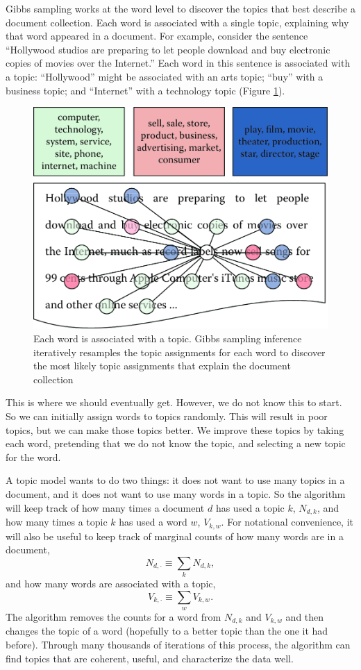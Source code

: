 \documentclass[]{krantz}
\begin{document}
Gibbs sampling works at the word level to discover the topics that best
describe a document collection. Each word is associated with a single
topic, explaining why that word appeared in a document. For example,
consider the sentence ``Hollywood studios are preparing to let people
download and buy electronic copies of movies over the Internet.'' Each
word in this sentence is associated with a topic: ``Hollywood'' might be
associated with an arts topic; ``buy'' with a business topic; and
``Internet'' with a technology topic (Figure \ref{fig:inference-1}).

\enlargethispage{18pt}

\begin{figure}

{\centering \includegraphics[width=0.7\linewidth]{ChapterText/figures/inference_1} 

}

\caption{Each word is associated with a topic. Gibbs sampling inference iteratively resamples the topic assignments for each word to discover the most likely topic assignments that explain the document collection}\label{fig:inference-1}
\end{figure}

This is where we should eventually get. However, we do not know this to
start. So we can initially assign words to topics randomly. This will
result in poor topics, but we can make those topics better. We improve
these topics by taking each word, pretending that we do not know the
topic, and selecting a new topic for the word.

A topic model wants to do two things: it does not want to use many
topics in a document, and it does not want to use many words in a topic.
So the algorithm will keep track of how many times a document \(d\) has
used a topic \(k\), \(N_{d,k}\), and how many times a topic \(k\) has
used a word \(w\), \(V_{k,w}\). For notational convenience, it will also
be useful to keep track of marginal counts of how many words are in a
document, \[N_{d, \cdot} \equiv \sum_k N_{d,k},\] and how many words are
associated with a topic, \[V_{k, \cdot} \equiv \sum_w V_{k, w}.\] The
algorithm removes the counts for a word from \(N_{d,k}\) and \(V_{k,w}\)
and then changes the topic of a word (hopefully to a better topic than
the one it had before). Through many thousands of iterations of this
process, the algorithm can find topics that are coherent, useful, and
characterize the data well.
\end{document}
